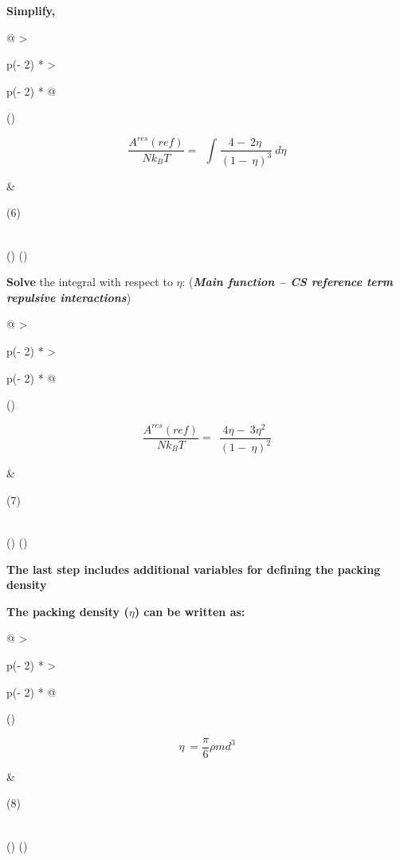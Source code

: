 \documentclass[
]{article}
\begin{document}
\textbf{Simplify,}

\begin{longtable}[]{@{}
  >{\raggedright\arraybackslash}p{(\columnwidth - 2\tabcolsep) * }
  >{\raggedright\arraybackslash}p{(\columnwidth - 2\tabcolsep) * }@{}}
\toprule()
\begin{minipage}[b]{\linewidth}\raggedright
\[\frac{A^{res}(ref)}{Nk_{B}T} = \ \ \int_{}^{}{\frac{4 - \ 2\eta\ }{(1 - \ \eta)^{3}}\ d\eta}\]
\end{minipage} & \begin{minipage}[b]{\linewidth}\raggedright
(6)
\end{minipage} \\
\midrule()
\endhead
\bottomrule()
\end{longtable}

\textbf{Solve} the integral with respect to \(\eta\):
(\emph{\textbf{Main function -- CS reference term repulsive
interactions}})

\begin{longtable}[]{@{}
  >{\raggedright\arraybackslash}p{(\columnwidth - 2\tabcolsep) * }
  >{\raggedright\arraybackslash}p{(\columnwidth - 2\tabcolsep) * }@{}}
\toprule()
\begin{minipage}[b]{\linewidth}\raggedright
\[\frac{A^{res}(ref)}{Nk_{B}T} = \ \ \frac{4\eta - \ 3\eta^{2}\ }{(1 - \ \eta)^{2}}\]
\end{minipage} & \begin{minipage}[b]{\linewidth}\raggedright
(7)
\end{minipage} \\
\midrule()
\endhead
\bottomrule()
\end{longtable}

\textbf{The last step includes additional variables for defining the
packing density}

\textbf{The packing density (}\(\eta\)\textbf{) can be written as:}

\begin{longtable}[]{@{}
  >{\raggedright\arraybackslash}p{(\columnwidth - 2\tabcolsep) * }
  >{\raggedright\arraybackslash}p{(\columnwidth - 2\tabcolsep) * }@{}}
\toprule()
\begin{minipage}[b]{\linewidth}\raggedright
\[\eta\  = \frac{\pi}{6}\rho md^{3}\]
\end{minipage} & \begin{minipage}[b]{\linewidth}\raggedright
(8)
\end{minipage} \\
\midrule()
\endhead
\bottomrule()
\end{longtable}
\end{document}
